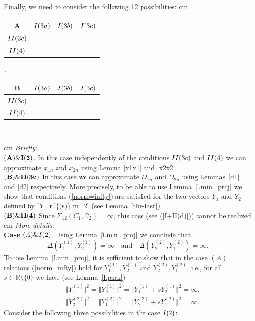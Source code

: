 \documentclass[preprint,12pt]{elsarticle}
\numberwithin{equation}{section}
\begin{document}
\vskip 0.5cm 
 Finally, we need to consider the  following 12 possibilities:
  cm
\begin{tabular}{|c|c|c|c|} 
 \hline
A&${\rm I}(3a)$&${\rm I}(3b)$&${\rm I}(3c)$\\
 \hline
${\rm II}(3c)$&&&\\ 
 \hline
 $ {\rm II}(4)$&&&\\ 
 \hline
\end{tabular}\,.
%
\quad
\begin{tabular}{|c|c|c|c|} 
 \hline
B&${\rm I}(3a)$&${\rm I}(3b)$&${\rm I}(3c)$\\
 \hline
${\rm II}(3c)$&&&\\ 
 \hline
 $ {\rm II}(4)$&&&\\ 
 \hline
\end{tabular}\,.


  cm
{\it Briefly}:\\
 ${\bf (A)\&I(2)}$.  In this case
independently of the conditions ${\rm II(3c)}$ and ${\rm II(4)}$ we can approximate
$x_{1n}$ and $x_{2n}$ using Lemma \ref{x1x1} and \ref{x2x2}.\\
%
${\bf (B)\&II(3c)}$ In this case
we can  approximate $D_{1n}$ and $D_{2n}$ using Lemmas~\ref{d1} and
\ref{d2} respectively. More precisely, to be able to use Lemma~\ref{l.min=proj} we show that conditions
(\ref{norm=infty}) are satisfied for the two vectors $Y_1$ and $Y_2$ defined by \eqref{Y_r^{(s)}.m=2} (see Lemma~\ref{the-last}).\\
%
${\bf (B)\&II(4)}$  Since $\Sigma_{12}(C_1,C_2)=\infty$, this  case
(see (\ref{I+II(d)})) cannot be realized 
 cm
{\it More details}:\\
{\bf Case} ${\rm (A)\&I(2)}$. Using Lemma~\ref{l.min=proj} we  conclude that
 \begin{equation}
\label{xx3}
\Delta(Y_1^{(1)},Y_2^{(1)})=\infty\quad \text{and} \quad \Delta(Y_2^{(2)},Y_1^{(2)})=\infty.
\end{equation}
%
To use Lemma~\ref{l.min=proj}, it is sufficient to show that in the case $(A)$ relations (\ref{norm=infty}) hold for
$Y_1^{(1)},Y_2^{(1)}$ and $Y_2^{(2)},Y_1^{(2)}$, i.e., for all
$s\in {\mathbb R}\setminus\{0\}$ we have (see Lemma~\ref{l.park})
%
\begin{eqnarray}
 \label{norm=infty(1,2)}
&&\Vert Y_1^{(1)}\Vert^2\!=\!\Vert Y_2^{(1)}\Vert^2\!=\!\Vert Y_1^{(1)}+s Y_2^{(1)}\Vert^2=\infty,\\
\nonumber
&&\Vert Y_2^{(2)}\Vert^2\!=\!\Vert Y_1^{(2)}\Vert^2\!=\!\Vert Y_2^{(2)}+s Y_1^{(2)}\Vert^2=\infty.
\end{eqnarray}
%
Consider the following three possibilities in the case ${\rm I(2)}$:\\
%
\end{document}

